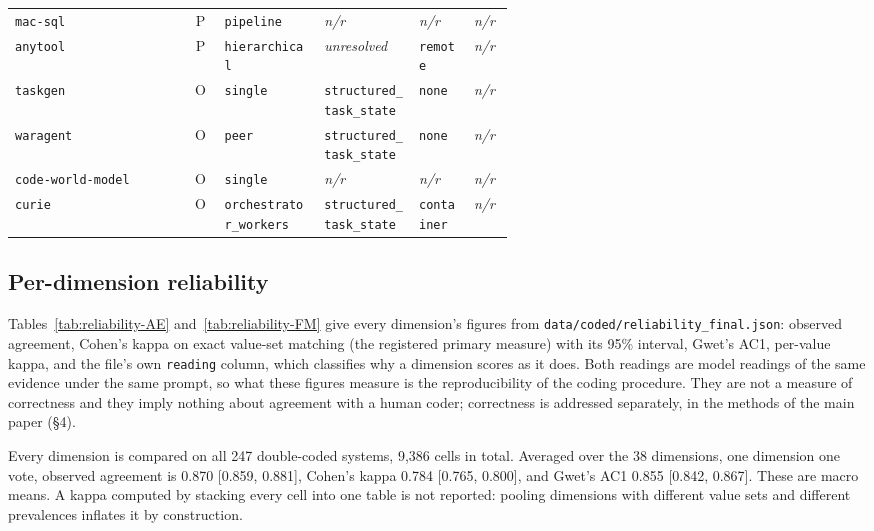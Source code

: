 \begin{table}[htbp]
\begin{tabular}{@{}l c p{0.20\linewidth} p{0.19\linewidth} p{0.11\linewidth} p{0.08\linewidth}@{}}
\texttt{mac-sql} & P & \raggedright \texttt{pipeline} & \raggedright \emph{n/r} & \raggedright \emph{n/r} & \raggedright \emph{n/r} \tabularnewline
\texttt{anytool} & P & \raggedright \texttt{hierarchical} & \raggedright \emph{unresolved} & \raggedright \texttt{remote} & \raggedright \emph{n/r} \tabularnewline
\texttt{taskgen} & O & \raggedright \texttt{single} & \raggedright \texttt{structured\_task\_state} & \raggedright \texttt{none} & \raggedright \emph{n/r} \tabularnewline
\texttt{waragent} & O & \raggedright \texttt{peer} & \raggedright \texttt{structured\_task\_state} & \raggedright \texttt{none} & \raggedright \emph{n/r} \tabularnewline
\texttt{code-world-model} & O & \raggedright \texttt{single} & \raggedright \emph{n/r} & \raggedright \emph{n/r} & \raggedright \emph{n/r} \tabularnewline
\texttt{curie} & O & \raggedright \texttt{orchestrator\_workers} & \raggedright \texttt{structured\_task\_state} & \raggedright \texttt{container} & \raggedright \emph{n/r} \tabularnewline
\bottomrule
\end{tabular}
\end{table}

\subsection{Per-dimension reliability}
\label{subsec:release-reliability}

Tables~\ref{tab:reliability-AE} and~\ref{tab:reliability-FM} give every dimension's figures from
\texttt{data/coded/reliability\_final.json}: observed agreement, Cohen's kappa on exact value-set
matching (the registered primary measure) with its 95\% interval, Gwet's AC1, per-value kappa, and
the file's own \texttt{reading} column, which classifies why a dimension scores as it does. Both
readings are model readings of the same evidence under the same prompt, so what these figures
measure is the reproducibility of the coding procedure. They are not a measure of correctness and
they imply nothing about agreement with a human coder; correctness is addressed separately, in
the methods of the main paper (\S4).

Every dimension is compared on all 247 double-coded systems, 9,386 cells in total.
Averaged over the 38 dimensions, one dimension one vote, observed agreement is 0.870
[0.859, 0.881], Cohen's kappa 0.784 [0.765, 0.800], and Gwet's AC1 0.855 [0.842, 0.867]. These are
macro means. A kappa computed by
stacking every cell into one table is not reported: pooling dimensions with different value sets and
different prevalences inflates it by construction.

